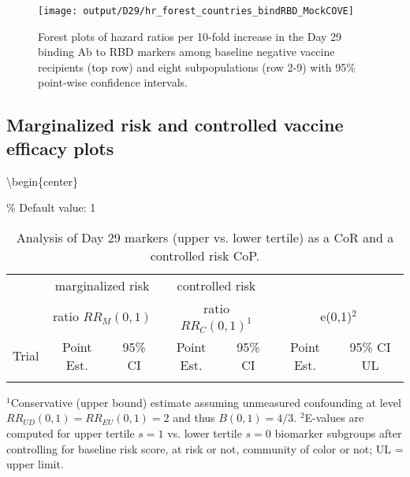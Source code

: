 \documentclass[
]{article}
\begin{document}
\begin{figure}[H]
    \centering
    \texttt{[image: output/D29/hr\_forest\_countries\_bindRBD\_MockCOVE]}
    \caption{Forest plots of hazard ratios per 10-fold increase in the  Day 29 binding Ab to RBD markers among baseline negative vaccine recipients (top row) and eight subpopulations (row 2-9) with 95\% point-wise confidence intervals.}
\end{figure}

\fi

\hypertarget{marginalized-risk-and-controlled-vaccine-efficacy-plots-1}{%
\subsection{Marginalized risk and controlled vaccine efficacy plots}\label{marginalized-risk-and-controlled-vaccine-efficacy-plots-1}}

\textbackslash begin\{center\}
\begingroup

\renewcommand{\arraystretch}{2}

\% Default value: 1

\begin{table}[H] \centering
\doublespacing
\singlespacing
\begin{tabular}{lcccccc} \hline \hline
 & \multicolumn{2}{c}{marginalized risk} & \multicolumn{2}{c}{controlled risk} & & \\ 
 & \multicolumn{2}{c}{ratio $RR_M(0,1)$} & \multicolumn{2}{c}{ratio $RR_C(0,1)^1$} & \multicolumn{2}{c}{e(0,1)$^2$} \\ 
Trial  & Point Est. & 95\% CI  &    Point Est. & 95\% CI  &   Point Est.  & 95\% CI UL \\ \hline
  \\ \hline \hline
\end{tabular}
\newline
\caption{Analysis of Day 29 markers (upper vs. lower tertile) as a CoR and a controlled risk CoP.}
\doublespacing
\noindent $^1$Conservative (upper bound) estimate assuming unmeasured confounding at level $RR_{UD}(0,1)=RR_{EU}(0,1) = 2$ and thus $B(0,1)=4/3$. \newline
\noindent $^2$E-values are computed for upper tertile $s=1$ vs. lower tertile $s=0$ biomarker subgroups after controlling for baseline risk score, at risk or not, community of color or not; UL = upper limit.
\label{table1}
\end{table}
\endgroup
\end{document}
